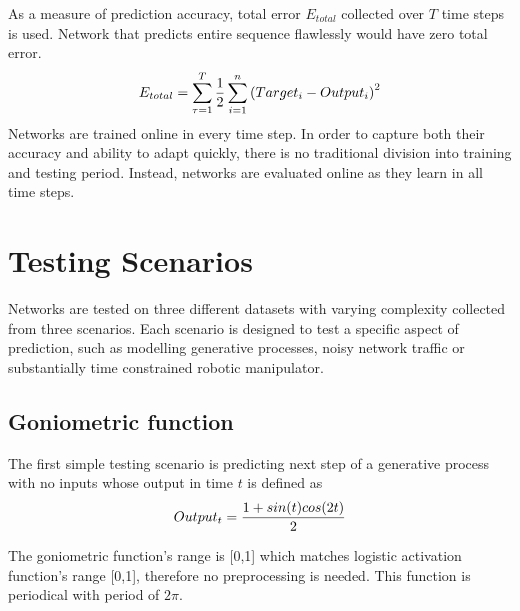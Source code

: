 \documentclass[12pt,oneside]{fithesis2}
\begin{document}
As a measure of prediction accuracy, total error $E_{total}$ collected over $T$ time steps is used. Network that predicts entire sequence flawlessly would have zero total error. %
$$E_{total} = \sum\limits_{\tau = 1}^T {1 \over 2} \sum\limits_{i=1}^{n}\left(Target_i - Output_i\right)^2$$
Networks are trained online in every time step. In order to capture both their accuracy and ability to adapt quickly, there is no traditional division into training and testing period. Instead, networks are evaluated online as they learn in all time steps.

\section{Testing Scenarios}
Networks are tested on three different datasets with varying complexity collected from three scenarios. Each scenario is designed to test a specific aspect of prediction, such as modelling generative processes, noisy network traffic or substantially time constrained robotic manipulator.
\subsection{Goniometric function}
The first simple testing scenario is predicting next step of a generative process with no inputs whose output in time $t$ is defined as
$$Output_t ={{1 + sin(t)cos(2t)} \over 2}$$


The goniometric function's range is [0,1] which matches logistic activation function's range [0,1], therefore no preprocessing is needed. This function is periodical with period of $2\pi$.
\end{document}
